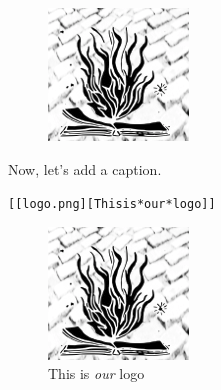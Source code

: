 \documentclass[DIV=12,%
               BCOR=0mm,%
               fontsize=10pt,%
               oneside,%
               paper=210mm:11in]{scrbook}
\begin{document}
\begin{figure}[htbp!]
\centering
\includegraphics[width=\textwidth]{logo.png}
\end{figure}


Now, let's add a caption.


\begin{alltt}
[[logo.png][This is *our* logo]]

\end{alltt}


\begin{figure}[htbp!]
\centering
\includegraphics[width=\textwidth]{logo.png}
\caption[]{\noindent This is \emph{our} logo}
\end{figure}
\end{document}

